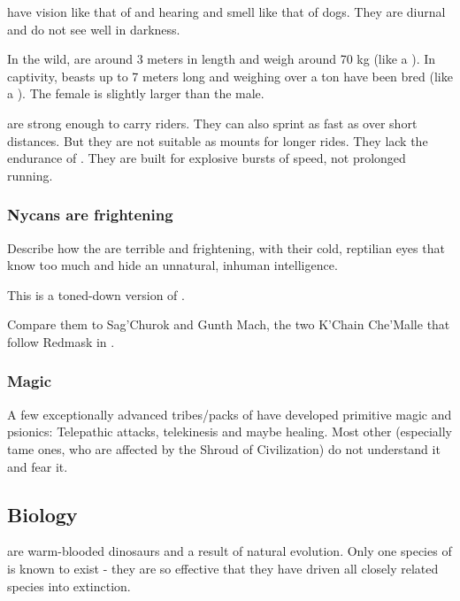 \Nycans{} have vision like that of \humans{} and hearing and smell like that of dogs. They are diurnal and do not see well in darkness. 

In the wild, \nycans{} are around 3 meters in length and weigh around 70 kg (like a ). 
In captivity, beasts up to 7 meters long and weighing over a ton have been bred (like a ). 
The female is slightly larger than the male. 

\Nycans{} are strong enough to carry riders. 
They can also sprint as fast as  over short distances. 
But they are not suitable as mounts for longer rides. 
They lack the endurance of \relcs. 
They are built for explosive bursts of speed, not prolonged running. 






\subsubsection{Nycans are frightening}
Describe how the \nycans{} are terrible and frightening, with their cold, reptilian eyes that know too much and hide an unnatural, inhuman intelligence. 

This is a toned-down version of . 

Compare them to Sag'Churok and Gunth Mach, the two K'Chain Che'Malle that follow Redmask in \MalazanReapersGale.






\subsubsection{Magic}
A few exceptionally advanced tribes/packs of \nycans{} have developed primitive magic and psionics: 
Telepathic attacks, telekinesis and maybe healing. 
Most other \nycans{} (especially tame ones, who are affected by the Shroud of Civilization) do not understand it and fear it. 









\subsection{Biology}
\Nycans{} are warm-blooded dinosaurs and a result of natural evolution. Only one species of \nycan{} is known to exist - they are so effective that they have driven all closely related species into extinction. 

